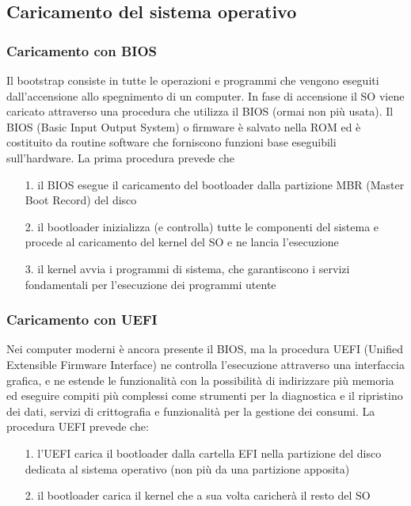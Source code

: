 \documentclass[a4paper]{article}
\begin{document}
\subsection{Caricamento del sistema operativo}
\subsubsection*{Caricamento con BIOS}
Il bootstrap consiste in tutte le operazioni e programmi che vengono eseguiti dall'accensione allo spegnimento di un computer.
In fase di accensione il SO viene caricato attraverso una procedura che utilizza il BIOS (ormai non più usata). Il BIOS
(Basic Input Output System) o firmware è salvato nella ROM ed è costituito da routine software che forniscono funzioni base
eseguibili sull'hardware. La prima procedura prevede che
\begin{itemize}
	\item[1.] il BIOS esegue il caricamento del bootloader dalla partizione MBR (Master Boot Record) del disco
	\item[2.] il bootloader inizializza (e controlla) tutte le componenti del sistema e procede al caricamento del kernel del SO
	e ne lancia l’esecuzione
	\item[3.] il kernel avvia i programmi di sistema, che garantiscono i servizi fondamentali per l’esecuzione dei programmi utente
\end{itemize}

\subsubsection*{Caricamento con UEFI}
Nei computer moderni è ancora presente il BIOS, ma la procedura UEFI (Unified Extensible Firmware Interface) ne controlla
l'esecuzione attraverso una interfaccia grafica, e ne estende le funzionalità con la possibilità di indirizzare più memoria
ed eseguire compiti più complessi come strumenti per la diagnostica e il ripristino dei dati, servizi di crittografia e
funzionalità per la gestione dei consumi. La procedura UEFI prevede che:
\begin{itemize}
	\item[1.] l'UEFI carica il bootloader dalla cartella EFI nella partizione del disco dedicata al sistema operativo (non più
	da una partizione apposita)
	\item[2.] il bootloader carica il kernel che a sua volta caricherà il resto del SO
\end{itemize}

\end{document}
